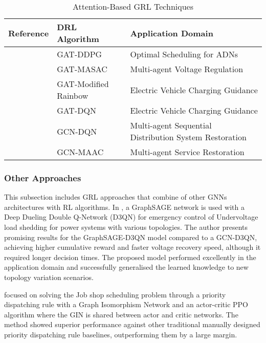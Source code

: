 \documentclass[11pt,a4paper]{article}
\begin{document}
\begin{table}[h!]
\centering
\caption{Attention-Based GRL Techniques}
\begin{tabular}{|P{2cm}|P{4cm}|p{6cm}|  }
 \hline
 \textbf{Reference} & \textbf{DRL Algorithm} & \textbf{Application Domain} \\
 \hline
 \cite{xingRealtimeOptimalScheduling2023} & GAT-DDPG & Optimal Scheduling for ADNs  \\ \hline
  \cite{chenPhysicalassistedMultiagentGraph2023}  &  GAT-MASAC  & Multi-agent Voltage Regulation \\ \hline 
 \cite{xingBilevelGraphReinforcement2023} & GAT-Modified Rainbow & Electric Vehicle Charging Guidance \\ \hline
 \cite{xuRealtimeFastCharging2022} & GAT-DQN & Electric Vehicle Charging Guidance \\ \hline 
 \cite{zhaoLearningSequentialDistribution2022} & GCN-DQN & Multi-agent Sequential Distribution System Restoration \\ \hline
 \cite{fanAttentionBasedMultiAgentGraph2023} & GCN-MAAC & Multi-agent Service Restoration \\ \hline
\end{tabular}
\end{table}


\subsubsection{Other Approaches}

This subsection includes \ac{GRL} approaches that combine of other \acp{GNN} architectures with \ac{RL} algorithms. In \cite{peiEmergencyControlStrategy2023}, a GraphSAGE network is used with a Deep Dueling Double Q-Network (D3QN) for emergency control of Undervoltage load shedding for power systems with various topologies. The author presents promising results for the GraphSAGE-D3QN model compared to a GCN-D3QN, achieving higher cumulative reward and faster voltage recovery speed, although it required longer decision times. The proposed model performed excellently in the application domain and successfully generalised the learned knowledge to new topology variation scenarios. \par
\cite{zhangLearningDispatchJob2020} focused on solving the Job shop scheduling problem through a priority dispatching rule with a Graph Isomorphism Network \cite{xuHowPowerfulAre2019} and an actor-critic \ac{PPO} algorithm where the GIN is shared between actor and critic networks. The method showed superior performance against other traditional manually designed priority dispatching rule baselines, outperforming them by a large margin.
\end{document}
